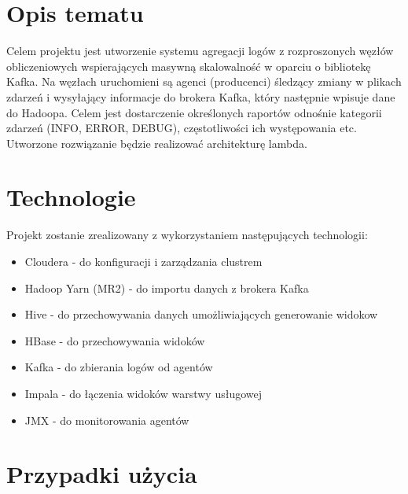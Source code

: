 \documentclass[a4paper,11pt]{article}
\begin{document}
\section{Opis tematu}
    Celem projektu jest utworzenie systemu agregacji logów z rozproszonych węzłów obliczeniowych wspierających masywną skalowalność w oparciu o bibliotekę Kafka. Na węzłach uruchomieni są agenci (producenci) śledzący zmiany w plikach zdarzeń i wysyłający informacje do brokera Kafka, który następnie wpisuje dane do Hadoopa. Celem jest dostarczenie określonych raportów odnośnie kategorii zdarzeń (INFO, ERROR, DEBUG), częstotliwości ich występowania etc. Utworzone rozwiązanie będzie realizować architekturę lambda.

\section{Technologie} 
    Projekt zostanie zrealizowany z wykorzystaniem następujących technologii:
    \begin{itemize}
        \item Cloudera - do konfiguracji i zarządzania clustrem
        \item Hadoop Yarn (MR2) - do importu danych z brokera Kafka
        \item Hive - do przechowywania danych umożliwiających generowanie widokow
        \item HBase - do przechowywania widoków
        \item Kafka - do zbierania logów od agentów
        \item Impala - do łączenia widoków warstwy usługowej
        \item JMX - do monitorowania agentów
    \end{itemize}

\section{Przypadki użycia}

\end{document}
